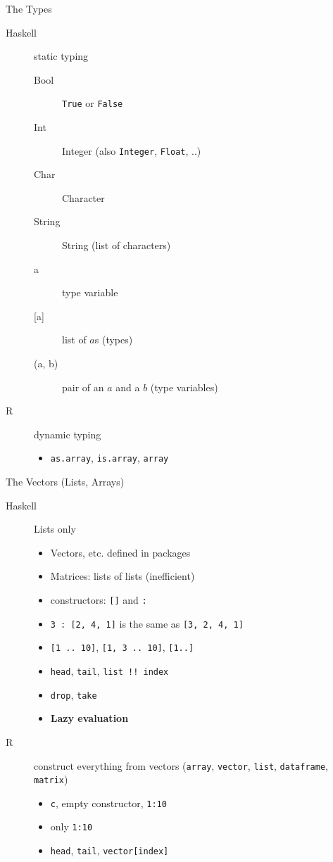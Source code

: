 \documentclass{beamer}
\begin{document}
\begin{frame}{The Types}
  \begin{description}
    \item[Haskell] static typing
      \begin{description}
        \item[Bool] \texttt{True} or \texttt{False}
        \item[Int] Integer (also \texttt{Integer}, \texttt{Float}, ..)
        \item[Char] Character
        \item[String] String (list of characters)
        \item[a] type variable
        \item[{[a]}] list of $a$s (types)
        \item[{(a, b)}] pair of an $a$ and a $b$ (type variables)
      \end{description}
    \item[R] dynamic typing
      \begin{itemize}
        \item \texttt{as.array}, \texttt{is.array}, \texttt{array}
      \end{itemize}
  \end{description}
\end{frame}

\begin{frame}{The Vectors (Lists, Arrays)}
  \begin{description}
    \item[Haskell] Lists only
      \begin{itemize}
        \item Vectors, etc. defined in packages
        \item Matrices: lists of lists (inefficient)
        \item constructors: \texttt{[]} and \texttt{:}
        \item \texttt{3 : [2, 4, 1]} is the same as \texttt{[3, 2, 4, 1]}
        \item \texttt{[1 .. 10]}, \texttt{[1, 3 .. 10]}, \texttt{[1..]}
        \item \texttt{head}, \texttt{tail}, \texttt{list !! index}
        \item \texttt{drop}, \texttt{take}
        \item \textbf{Lazy evaluation}
      \end{itemize}
    \item[R] construct everything from vectors (\texttt{array},
      \texttt{vector}, \texttt{list}, \texttt{dataframe}, \texttt{matrix})
      \begin{itemize}
        \item \texttt{c}, empty constructor, \texttt{1:10}
        \item only \texttt{1:10}
        \item \texttt{head}, \texttt{tail}, \texttt{vector[index]}
      \end{itemize}
  \end{description}
\end{frame}
\end{document}
